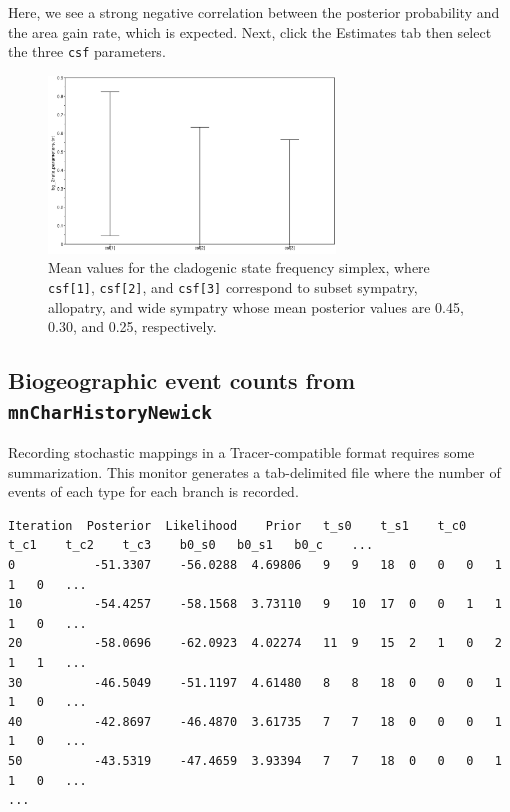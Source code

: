 Here, we see a strong negative correlation between the posterior probability and the area gain rate, which is expected.
Next, click the Estimates tab then select the three {\tt csf} parameters.

\begin{figure}[H]
\centering
\includegraphics[width=3in]{../RB_Biogeography_Tutorial/figures/clado_freq_posterior}
\caption{Mean values for the cladogenic state frequency simplex, where {\tt csf[1]}, {\tt csf[2]}, and {\tt csf[3]} correspond to subset sympatry, allopatry, and wide sympatry whose mean posterior values are 0.45, 0.30, and 0.25, respectively.}
\end{figure}


\subsection{Biogeographic event counts from {\tt mnCharHistoryNewick}}

Recording stochastic mappings in a Tracer-compatible format requires some summarization.
This monitor generates a tab-delimited file where the number of events of each type for each branch is recorded.


\begin{framed}
\begin{lstlisting}
Iteration  Posterior  Likelihood    Prior	t_s0	t_s1	t_c0	t_c1	t_c2	t_c3	b0_s0	b0_s1	b0_c	...
0           -51.3307    -56.0288  4.69806	9	9	18	0	0	0	1	1	0	...	
10          -54.4257    -58.1568  3.73110	9	10	17	0	0	1	1	1	0	...
20          -58.0696    -62.0923  4.02274	11	9	15	2	1	0	2	1	1	...
30          -46.5049    -51.1197  4.61480	8	8	18	0	0	0	1	1	0	...
40          -42.8697    -46.4870  3.61735	7	7	18	0	0	0	1	1	0	...
50          -43.5319    -47.4659  3.93394	7	7	18	0	0	0	1	1	0	...
...
\end{lstlisting}
\end{framed}

